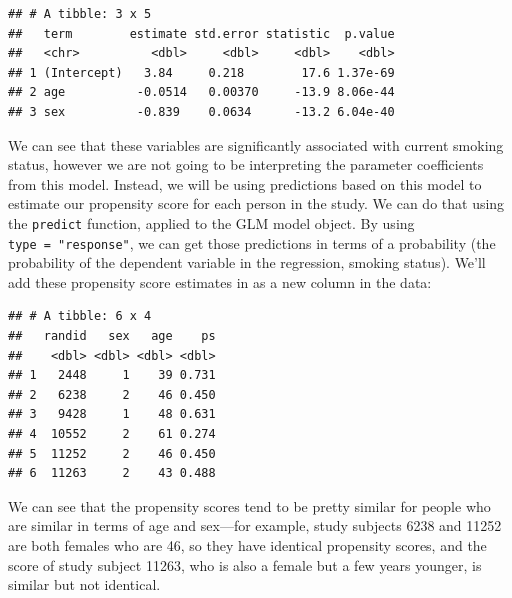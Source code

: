 \documentclass[
]{book}
\newenvironment{Shaded}{\begin{snugshade}}{\end{snugshade}}
\newcommand{\DataTypeTok}[1]{\textcolor[rgb]{0.13,0.29,0.53}{#1}}
\newcommand{\KeywordTok}[1]{\textcolor[rgb]{0.13,0.29,0.53}{\textbf{#1}}}
\newcommand{\NormalTok}[1]{#1}
\newcommand{\OperatorTok}[1]{\textcolor[rgb]{0.81,0.36,0.00}{\textbf{#1}}}
\newcommand{\StringTok}[1]{\textcolor[rgb]{0.31,0.60,0.02}{#1}}
\begin{document}
\begin{verbatim}
## # A tibble: 3 x 5
##   term        estimate std.error statistic  p.value
##   <chr>          <dbl>     <dbl>     <dbl>    <dbl>
## 1 (Intercept)   3.84     0.218        17.6 1.37e-69
## 2 age          -0.0514   0.00370     -13.9 8.06e-44
## 3 sex          -0.839    0.0634      -13.2 6.04e-40
\end{verbatim}

We can see that these variables are significantly associated with current smoking status, however we are not going to be interpreting the parameter coefficients from this model. Instead, we will be using predictions based on this model to estimate our propensity score for each person in the study. We can do that using the \texttt{predict} function, applied to the GLM model object. By using \texttt{type\ =\ "response"}, we can get those predictions in terms of a probability (the probability of the dependent variable in the regression, smoking status). We'll add these propensity score estimates in as a new column in the data:

\begin{Shaded}
\end{Shaded}

\begin{verbatim}
## # A tibble: 6 x 4
##   randid   sex   age    ps
##    <dbl> <dbl> <dbl> <dbl>
## 1   2448     1    39 0.731
## 2   6238     2    46 0.450
## 3   9428     1    48 0.631
## 4  10552     2    61 0.274
## 5  11252     2    46 0.450
## 6  11263     2    43 0.488
\end{verbatim}

We can see that the propensity scores tend to be pretty similar for people who are similar in terms of age and sex---for example, study subjects 6238 and 11252 are both females who are 46, so they have identical propensity scores, and the score of study subject 11263, who is also a female but a few years younger, is similar but not identical.
\end{document}
